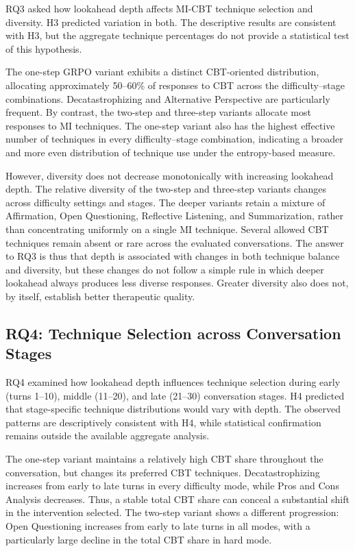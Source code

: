 RQ3 asked how lookahead depth affects MI-CBT technique selection and diversity. H3 predicted variation in both. The descriptive results are consistent with H3, but the aggregate technique percentages do not provide a statistical test of this hypothesis.

The one-step GRPO variant exhibits a distinct CBT-oriented distribution, allocating approximately 50--60\% of responses to CBT across the difficulty--stage combinations. Decatastrophizing and Alternative Perspective are particularly frequent. By contrast, the two-step and three-step variants allocate most responses to MI techniques. The one-step variant also has the highest effective number of techniques in every difficulty--stage combination, indicating a broader and more even distribution of technique use under the entropy-based measure.

However, diversity does not decrease monotonically with increasing lookahead depth. The relative diversity of the two-step and three-step variants changes across difficulty settings and stages. The deeper variants retain a mixture of Affirmation, Open Questioning, Reflective Listening, and Summarization, rather than concentrating uniformly on a single MI technique. Several allowed CBT techniques remain absent or rare across the evaluated conversations. The answer to RQ3 is thus that depth is associated with changes in both technique balance and diversity, but these changes do not follow a simple rule in which deeper lookahead always produces less diverse responses. Greater diversity also does not, by itself, establish better therapeutic quality.

\subsection{RQ4: Technique Selection across Conversation Stages}

RQ4 examined how lookahead depth influences technique selection during early (turns 1--10), middle (11--20), and late (21--30) conversation stages. H4 predicted that stage-specific technique distributions would vary with depth. The observed patterns are descriptively consistent with H4, while statistical confirmation remains outside the available aggregate analysis.

The one-step variant maintains a relatively high CBT share throughout the conversation, but changes its preferred CBT techniques. Decatastrophizing increases from early to late turns in every difficulty mode, while Pros and Cons Analysis decreases. Thus, a stable total CBT share can conceal a substantial shift in the intervention selected. The two-step variant shows a different progression: Open Questioning increases from early to late turns in all modes, with a particularly large decline in the total CBT share in hard mode.

